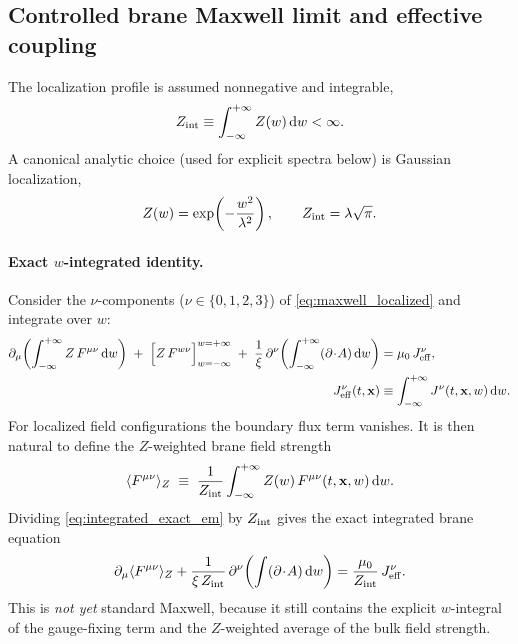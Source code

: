 \documentclass[11pt]{article}
\newcommand{\x}{\mathbf{x}}     %
\newcommand{\A}{A}              %
\newcommand{\F}{F}              %
\newcommand{\J}{J}              %
\newcommand{\Z}{Z}              %
\newcommand{\muzero}{\mu_0}
\newcommand{\Zint}{Z_{\rm int}}
\begin{document}
\subsection{Controlled brane Maxwell limit and effective coupling}
\label{sec:controlled_brane_maxwell}

The localization profile is assumed nonnegative and integrable,
\begin{equation}
\Zint \equiv \int_{-\infty}^{+\infty}\Z(w)\,\dd w < \infty.
\label{eq:Zint_def_em}
\end{equation}
A canonical analytic choice (used for explicit spectra below) is Gaussian
localization,
\begin{equation}
\Z(w)=\exp\!\left(-\frac{w^2}{\lambda^2}\right),
\qquad
\Zint=\lambda\sqrt{\pi}.
\label{eq:Z_gaussian_em}
\end{equation}

\paragraph{Exact \(w\)-integrated identity.}
Consider the \(\nu\)-components (\(\nu\in\{0,1,2,3\}\)) of
\eqref{eq:maxwell_localized} and integrate over \(w\):
\begin{align}
\partial_\mu\!\left(\int_{-\infty}^{+\infty}\Z\,\F^{\mu\nu}\,\dd w\right)
\;+\;
\Big[\Z\,\F^{w\nu}\Big]_{w=-\infty}^{w=+\infty}
\;+\;
\frac{1}{\xi}\,\partial^\nu\!\left(\int_{-\infty}^{+\infty}(\partial\!\cdot\!\A)\,\dd w\right)
&=\muzero\,\J_{\rm eff}^\nu,
\label{eq:integrated_exact_em}
\\
\J_{\rm eff}^\nu(t,\x)
&\equiv \int_{-\infty}^{+\infty} \J^\nu(t,\x,w)\,\dd w.
\end{align}
For localized field configurations the boundary flux term vanishes. It is then
natural to define the \(\Z\)-weighted brane field strength
\begin{equation}
\langle \F^{\mu\nu}\rangle_{\Z}
\;\equiv\;
\frac{1}{\Zint}\int_{-\infty}^{+\infty}\Z(w)\,\F^{\mu\nu}(t,\x,w)\,\dd w.
\label{eq:F_Z_weighted_def}
\end{equation}
Dividing \eqref{eq:integrated_exact_em} by \(\Zint\) gives the exact integrated
brane equation
\begin{equation}
\partial_\mu\langle \F^{\mu\nu}\rangle_{\Z}
+\frac{1}{\xi\,\Zint}\,\partial^\nu\!\left(\int(\partial\!\cdot\!\A)\,\dd w\right)
=\frac{\muzero}{\Zint}\,\J_{\rm eff}^\nu.
\label{eq:brane_maxwell_exact_weighted_em}
\end{equation}
This is \emph{not yet} standard Maxwell, because it still contains the explicit
\(w\)-integral of the gauge-fixing term and the \(\Z\)-weighted average of the bulk
field strength.
\end{document}
